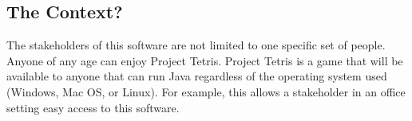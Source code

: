 \documentclass[11pt, oneside]{article}   	%
\begin{document}
\subsection{The Context?}
The stakeholders of this software are not limited to one specific set of people. Anyone of any age can enjoy Project Tetris. Project Tetris is a game that will be available to anyone that can run Java regardless of the operating system used (Windows, Mac OS, or Linux). For example, this allows a stakeholder in an office setting easy access to this software.
\end{document}
